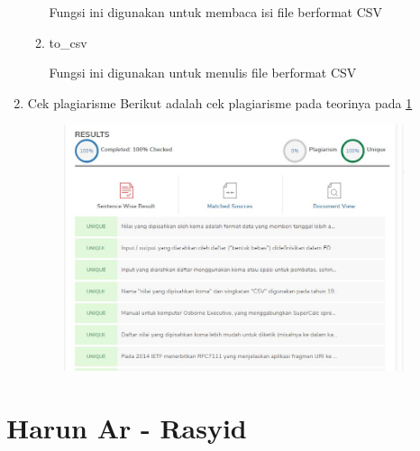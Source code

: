\begin{enumerate}
\begin{enumerate}
		   Fungsi ini digunakan untuk membaca isi file berformat CSV
		
		   
		
		   \item to\_csv
		
		   Fungsi ini digunakan untuk menulis file berformat CSV
		
		   
		
      \end{enumerate}
   \item Cek plagiarisme
   Berikut adalah cek plagiarisme pada teorinya pada \ref{Plagiarisme}
   \begin{figure}[H]
   \includegraphics[width=10cm]{figures/rahma/Chapter4/Plagiarisme.jpg}
   \centering
   \label{Plagiarisme}
    \end{figure}
\end{enumerate}
\section{Harun Ar - Rasyid}
